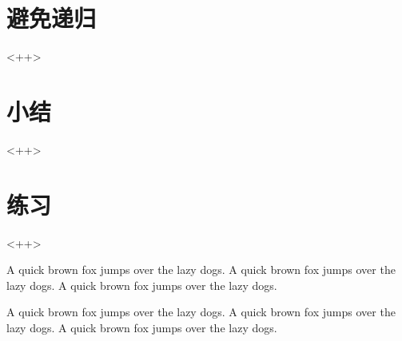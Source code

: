 \section{避免递归}<++>

\section{小结}<++>

\section{练习}<++>

A quick brown fox jumps over the lazy dogs.
A quick brown fox jumps over the lazy dogs.
A quick brown fox jumps over the lazy dogs.

A quick brown fox jumps over the lazy dogs.
A quick brown fox jumps over the lazy dogs.
A quick brown fox jumps over the lazy dogs.

\newpage{\thispagestyle{empty}\cleardoublepage}

